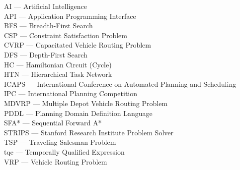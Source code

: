 
AI --- Artificial Intelligence\\
API --- Application Programming Interface\\
BFS --- Breadth-First Search\\
CSP --- Constraint Satisfaction Problem\\
CVRP --- Capacitated Vehicle Routing Problem\\
DFS --- Depth-First Search\\
HC --- Hamiltonian Circuit (Cycle)\\
HTN --- Hierarchical Task Network\\
ICAPS --- International Conference on Automated Planning and Scheduling\\
IPC --- International Planning Competition\\
MDVRP --- Multiple Depot Vehicle Routing Problem\\
PDDL --- Planning Domain Definition Language\\
SFA* --- Sequential Forward A*\\
STRIPS --- Stanford Research Institute Problem Solver\\
TSP --- Traveling Salesman Problem\\
tqe --- Temporally Qualified Expression\\
VRP --- Vehicle Routing Problem\\